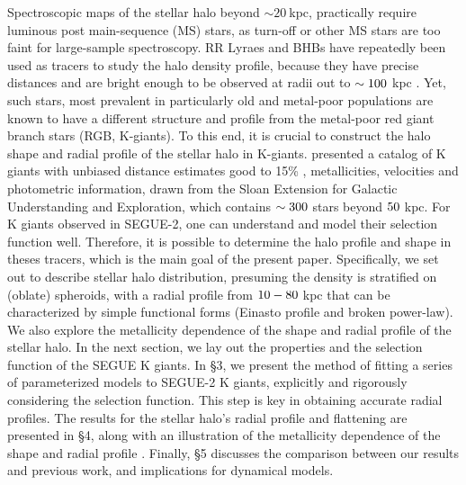\documentclass[12pt,preprint]{aastex}
\begin{document}
Spectroscopic maps of the stellar halo beyond $\sim 20~$kpc, practically require luminous
post main-sequence (MS) stars, as turn-off or other MS stars are too faint for large-sample spectroscopy. RR Lyraes and BHBs have repeatedly been used as tracers to study the halo density profile, because they have precise distances and are bright enough to be observed at radii out to $\rm \sim 100~$kpc \citep{Xue2011, Deason2011, Deason2014}. Yet, such stars, most prevalent in particularly old and metal-poor populations\citep{Bell2008, Xue2011} are known to have a different structure and profile from the metal-poor red giant branch stars (RGB, K-giants).
To this end, it is crucial to construct the halo shape and radial profile of the stellar halo in K-giants. \citet{Xue2014} presented a catalog of K giants with unbiased distance estimates good to 15\% , metallicities, velocities and photometric information, drawn from the Sloan Extension for Galactic Understanding and Exploration\citep[][SEGUE]{Yanny2009b}, which contains $\rm \sim 300$ stars beyond $\rm 50~$kpc.
For K giants observed in SEGUE-2, one can understand and model their selection function well. Therefore, it is possible to determine the halo profile and shape in theses tracers, which is the main goal of the present paper.
Specifically, we set out to describe stellar halo distribution, presuming the density is stratified on (oblate) spheroids, with a radial profile from $\rm 10-80~$kpc that can be characterized by simple  functional forms (Einasto profile and broken power-law). We also explore the metallicity dependence of the shape and radial profile of the stellar halo.
In the next section, we lay out the properties and the selection function of the SEGUE K giants. In \S 3, we present the method of fitting a series of parameterized models to SEGUE-2 K giants, explicitly and rigorously considering the selection function. This step is key in obtaining accurate radial profiles. The results for the stellar halo's radial profile and flattening are presented in \S 4, along with an illustration of the metallicity dependence of the shape and radial profile . Finally, \S 5 discusses the comparison between our results and previous work, and implications for dynamical models.
\end{document}
